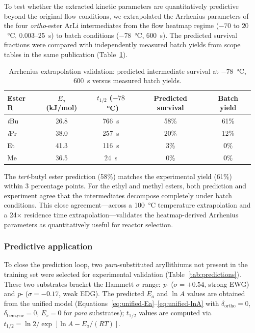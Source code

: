\documentclass[journal=jcisd8,manuscript=article]{achemso}
\begin{document}
To test whether the extracted kinetic parameters are quantitatively predictive beyond the original flow conditions, we extrapolated the Arrhenius parameters of the four \textit{ortho}-ester ArLi intermediates from the flow heatmap regime ($-70$ to $20$~\si{\celsius}, 0.003--25~s) to batch conditions ($-78$~\si{\celsius}, 600~s).
The predicted survival fractions were compared with independently measured batch yields from scope tables in the same publication (Table~\ref{tab:batch-validation}).

\begin{table}[htbp]
\centering
\caption{Arrhenius extrapolation validation: predicted intermediate survival at $-78$~\si{\celsius}, 600~s versus measured batch yields.}
\label{tab:batch-validation}
\begin{tabular}{@{}lcccc@{}}
\toprule
\textbf{Ester R} & \textbf{$E_a$ (kJ/mol)} & \textbf{$t_{1/2}$ ($-78$~\si{\celsius})} & \textbf{Predicted survival} & \textbf{Batch yield} \\
\midrule
\textit{t}Bu & 26.8 & 766~s & 58\% & 61\% \\
\textit{i}Pr & 38.0 & 257~s & 20\% & 12\% \\
Et            & 41.3 & 116~s & 3\%  & 0\% \\
Me            & 36.5 & 24~s  & 0\%  & 0\% \\
\bottomrule
\end{tabular}
\end{table}

The \textit{tert}-butyl ester prediction (58\%) matches the experimental yield (61\%) within 3 percentage points.
For the ethyl and methyl esters, both prediction and experiment agree that the intermediates decompose completely under batch conditions.
This close agreement---across a 100~\si{\celsius} temperature extrapolation and a 24$\times$ residence time extrapolation---validates the heatmap-derived Arrhenius parameters as quantitatively useful for reactor selection.

\subsubsection{Predictive application}

To close the prediction loop, two \textit{para}-substituted aryllithiums not present in the training set were selected for experimental validation (Table~\ref{tab:predictions}).
These two substrates bracket the Hammett $\sigma$ range: \textit{p}- ($\sigma = +0.54$, strong EWG) and \textit{p}- ($\sigma = -0.17$, weak EDG).
The predicted $E_a$ and $\ln A$ values are obtained from the unified model (Equations~\ref{eq:unified-Ea}--\ref{eq:unified-lnA} with $\delta_{\mathrm{ortho}} = 0$, $\delta_{\mathrm{benzyne}} = 0$, $E_s = 0$ for \textit{para} substrates); $t_{1/2}$ values are computed via $t_{1/2} = \ln 2 / \exp[\ln A - E_a/(RT)]$.
\end{document}
